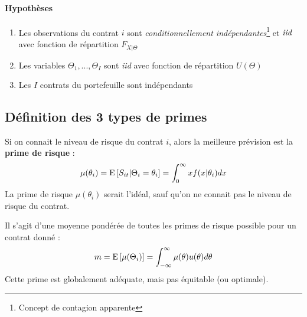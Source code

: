 \documentclass[10pt, french]{article}
\begin{document}
\begin{multicols*}{3}
\paragraph{Hypothèses}
\begin{enumerate}
\item Les observations du contrat $i$ sont \emph{conditionnellement indépendantes}\footnote{Concept de contagion apparente} et $\emph{iid}$ avec fonction de répartition $F_{X|\Theta}$
\item Les variables $\Theta_1, ..., \Theta_I$ sont \emph{iid} avec fonction de répartition $U(\Theta)$
\item Les $I$ contrats du portefeuille sont indépendants
\end{enumerate}

\subsection*{Définition des 3 types de primes}
\begin{definition}
Si on connait le niveau de risque du contrat $i$, alors la meilleure prévision est la \textbf{prime de risque} :
\begin{equation}
\mu(\theta_i) = \mathrm{E} \left[ S_{it} | \Theta_i = \theta_i \right] = \int_{0}^{\infty} x f(x | \theta_i) dx
\end{equation}
La prime de risque $\mu(\theta_i)$ serait l'idéal, sauf qu'on ne connait pas le niveau de risque du contrat.
\end{definition}

\begin{definition}
Il s'agit d'une moyenne pondérée de toutes les primes de risque possible pour un contrat donné :
\begin{equation}
m = \mathrm{E} \left[ \mu(\Theta_i) \right] = \int_{-\infty}^{\infty} \mu(\theta) u(\theta) d\theta
\end{equation}
Cette prime est globalement adéquate, mais pas équitable (ou optimale).
\end{definition}


\end{multicols*}
\end{document}
